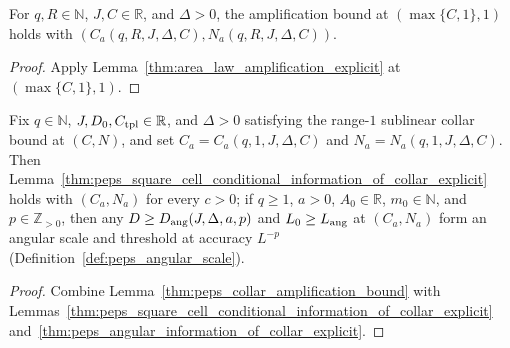 \begin{lemma}
    \label{thm:peps_collar_amplification_bound}
    \leanok
    For $q,R\in\mathbb N$, $J,C\in\mathbb R$, and $\Delta>0$,
    the amplification bound at $(\max\{C,1\},1)$ holds with $(C_a(q,R,J,\Delta,C),N_a(q,R,J,\Delta,C))$.
\end{lemma}
\begin{proof}\leanok
    Apply Lemma~\ref{thm:area_law_amplification_explicit} at $(\max\{C,1\},1)$.
\end{proof}

\begin{lemma}
    \label{thm:peps_information_of_collar_named_amplification}
    \leanok
    Fix $q\in\mathbb N$, $J,D_0,C_{\rm tpl}\in\mathbb R$, and $\Delta>0$ satisfying the range-$1$ sublinear collar bound at $(C,N)$, and set $C_a=C_a(q,1,J,\Delta,C)$
    and $N_a=N_a(q,1,J,\Delta,C)$. Then Lemma~\ref{thm:peps_square_cell_conditional_information_of_collar_explicit}
    holds with $(C_a,N_a)$ for every $c>0$; if $q\ge1$, $a>0$, $A_0\in\mathbb R$, $m_0\in\mathbb N$, and $p\in\mathbb Z_{>0}$, then any
    $D\ge D_{\rm ang}(J,\Delta,a,p)$ and $L_0\ge L_{\rm ang}$ at $(C_a,N_a)$ form an angular scale and threshold at accuracy $L^{-p}$ (Definition~\ref{def:peps_angular_scale}).
\end{lemma}
\begin{proof}\leanok
    Combine Lemma~\ref{thm:peps_collar_amplification_bound} with
    Lemmas~\ref{thm:peps_square_cell_conditional_information_of_collar_explicit}
    and~\ref{thm:peps_angular_information_of_collar_explicit}.
\end{proof}

